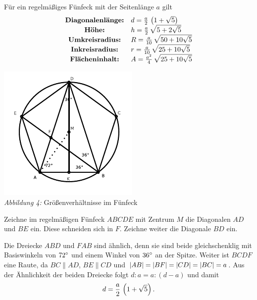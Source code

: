 \documentclass[11pt]{article}
\begin{document}
\begin{satz}
  Für ein regelmäßiges Fünfeck mit der Seitenlänge $a$ gilt
  \begin{gather*}
    \begin{array}{cl}    
      \text{\bf Diagonalenlänge:} & d=\frac{a}{2}\,\left(1+\sqrt{5}\right)\\
      \text{\bf Höhe:} & h=\frac{a}{2}\,\sqrt{5+2\sqrt{5}}\\
      \text{\bf Umkreisradius:} & R=\frac{a}{10}\,\sqrt{50+10\sqrt{5}}\\
      \text{\bf Inkreisradius:} & r=\frac{a}{10}\,\sqrt{25+10\sqrt{5}}\\
      \text{\bf Flächeninhalt:} & A=\frac{a^2}{4}\,\sqrt{25+10\sqrt{5}}
    \end{array}
  \end{gather*}
\end{satz}

\begin{center}
  \includegraphics[width=.5\textwidth]{graebe-05-1/Fuenfeck.pdf}\\
  \emph{Abbildung 4:} Größenverhältnisse im Fünfeck
\end{center}

Zeichne im regelmäßigen Fünfeck $ABCDE$ mit Zentrum $M$ die Diagonalen $AD$
und $BE$ ein.  Diese schneiden sich in $F$.  Zeichne weiter die Diagonale $BD$
ein.

Die Dreiecke $ABD$ und $FAB$ sind ähnlich, denn sie sind beide gleichschenklig
mit Basiswinkeln von $72^{\circ}$ und einem Winkel von $36^{\circ}$ an der Spitze.
Weiter ist $BCDF$ eine Raute, da $BC\parallel AD$, $BE\parallel CD$ und
$\left\vert {\mathnormal{AB}}\right\vert=\left\vert {\mathnormal{BF}}\right\vert=\left\vert {\mathnormal{CD}}\right\vert=\left\vert {\mathnormal{BC}}\right\vert=a$.  Aus der
Ähnlichkeit der beiden Dreiecke folgt $d:a=a:(d-a)$ und damit
\begin{gather*}
  d=\frac{a}{2}\,\left(1+\sqrt{5}\right).
\end{gather*}
\end{document}
